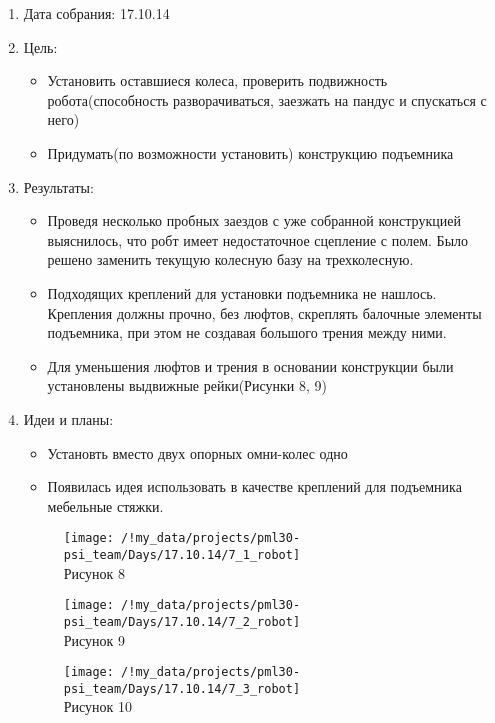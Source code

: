 
	\begin{enumerate}
	\item Дата собрания: 17.10.14
	\item Цель:
		\begin{itemize}
		\item Установить оставшиеся колеса, проверить подвижность робота(способность разворачиваться, заезжать на пандус и спускаться с него)
		\item Придумать(по возможности установить) конструкцию подъемника
		\end{itemize}
	\item Результаты:
		\begin{itemize}
		\item Проведя несколько пробных заездов с уже собранной конструкцией выяснилось, что робт имеет недостаточное сцепление с полем. Было решено заменить текущую колесную базу на трехколесную.
		\item Подходящих креплений для установки подъемника не нашлось. Крепления должны прочно, без люфтов, скреплять балочные элементы подъемника, при этом не создавая большого трения между ними.
		\item Для уменьшения люфтов и трения в основании конструкции были установлены выдвижные рейки(Рисунки 8, 9)
		\end{itemize}
	\item Идеи и планы:
		\begin{itemize}
		\item Установть вместо двух опорных омни-колес одно
		\item Появилась идея использовать в качестве креплений для подъемника мебельные стяжки.
		\end{itemize}
	\begin{figure} [h]
			\centering
			\begin{minipage}{0.3\linewidth}
				\texttt{[image: /!my\_data/projects/pml30-psi\_team/Days/17.10.14/7\_1\_robot]}\\ Рисунок 8
			\end{minipage}
			\begin{minipage}{0.3\linewidth}
				\texttt{[image: /!my\_data/projects/pml30-psi\_team/Days/17.10.14/7\_2\_robot]}\\ Рисунок 9
			\end{minipage}
			\begin{minipage}{0.3\linewidth}
				\texttt{[image: /!my\_data/projects/pml30-psi\_team/Days/17.10.14/7\_3\_robot]}\\ Рисунок 10
			\end{minipage}		
	\end{figure}
	\end{enumerate}
\newpage